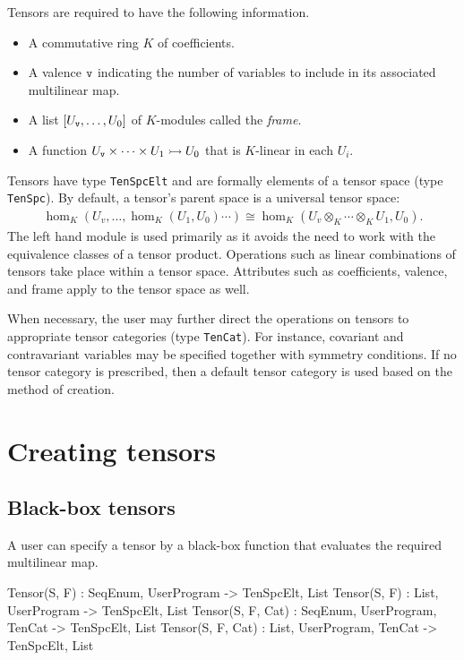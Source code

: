 
Tensors are required to have the following information.
\begin{itemize}
\item A commutative ring $K$ of coefficients.
\item A valence $\operatorname{\mathtt{v}}$ indicating the number of variables to include in its 
associated multilinear map.
\item A list $[U_{\operatorname{\mathtt{v}}},\dots, U_0]$ of $K$-modules called the \emph{frame}.
\item A function $U_{\operatorname{\mathtt{v}}}\times \cdots \times U_1\rightarrowtail U_0$ that is $K$-linear in each $U_i$.
\end{itemize}
Tensors have type \texttt{TenSpcElt} and are formally elements of a tensor space 
(type \texttt{TenSpc}).  
By default, a tensor's parent space is a universal tensor space:
\begin{align*}
	\hom_K(U_v,\dots,\hom_K(U_1,U_0)\cdots) \cong \hom_K(U_v\otimes_K\cdots \otimes_K U_1,U_0).
\end{align*}
The left hand module is used primarily as it avoids the need to work with the
equivalence classes of a tensor product. Operations such as linear combinations
of tensors take place within a tensor space. Attributes such as coefficients,
valence, and frame  apply to the tensor space as well.

When necessary, the user may further direct the operations on tensors to
appropriate tensor categories (type \texttt{TenCat}).  For instance, covariant
and contravariant variables may be specified together with symmetry
conditions.  If no tensor category is prescribed, then a default tensor category
is used based on the method of creation.
\medskip

\minitoc

\section{Creating tensors}

\subsection{Black-box tensors}
A user can specify a tensor by a black-box function that evaluates the required
multilinear map.

\begin{intrinsics}
Tensor(S, F) : SeqEnum, UserProgram -> TenSpcElt, List
Tensor(S, F) : List, UserProgram -> TenSpcElt, List
Tensor(S, F, Cat) : SeqEnum, UserProgram, TenCat -> TenSpcElt, List
Tensor(S, F, Cat) : List, UserProgram, TenCat -> TenSpcElt, List
\end{intrinsics}


